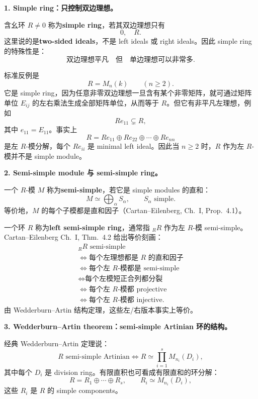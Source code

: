 \documentclass[a4paper]{ctexart}
\theoremstyle{definition}
\theoremstyle{analysis}
\theoremstyle{plain}
\begin{document}
\medskip

\textbf{1. Simple ring：只控制双边理想。}

含幺环 \(R\neq 0\) 称为\textbf{simple ring}，若其双边理想只有
\[
  0,\quad R.
\]
这里说的是\textbf{two-sided ideals}，不是 left ideals 或 right ideals。因此 simple ring 的特殊性是：
\[
  \text{双边理想平凡}
  \quad\text{但}\quad
  \text{单边理想可以非常多}.
\]

标准反例是
\[
  R=M_n(k)\qquad (n\ge 2).
\]
它是 simple ring，因为任意非零双边理想一旦含有某个非零矩阵，就可通过矩阵单位 \(E_{ij}\) 的左右乘法生成全部矩阵单位，从而等于 \(R\)。但它有非平凡左理想，例如
\[
  Re_{11}\subsetneq R,
\]
其中 \(e_{11}=E_{11}\)。事实上
\[
  R=Re_{11}\oplus Re_{22}\oplus\cdots\oplus Re_{nn}
\]
是左 \(R\)-模分解，每个 \(Re_{ii}\) 是 minimal left ideal。因此当 \(n\ge 2\) 时，\(R\) 作为左 \(R\)-模并不是 simple module。

\medskip

\textbf{2. Semi-simple module 与 semi-simple ring。}

一个 \(R\)-模 \(M\) 称为\textbf{semi-simple}，若它是 simple modules 的直和：
\[
  M\simeq \bigoplus_{\alpha} S_\alpha,
  \qquad S_\alpha\text{ simple}.
\]
等价地，\(M\) 的每个子模都是直和因子（Cartan--Eilenberg, Ch.~I, Prop.~4.1）。

一个环 \(R\) 称为\textbf{left semi-simple ring}，通常指 \({}_RR\) 作为左 \(R\)-模 semi-simple。Cartan--Eilenberg Ch.~I, Thm.~4.2 给出等价刻画：
\[
\begin{array}{c}
  {}_RR\text{ semi-simple}\\
  \Longleftrightarrow
  \text{每个左理想都是 }R\text{ 的直和因子}\\
  \Longleftrightarrow
  \text{每个左 }R\text{-模都是 semi-simple}\\
  \Longleftrightarrow
  \text{每个左模短正合列都分裂}\\
  \Longleftrightarrow
  \text{每个左 }R\text{-模都 projective}\\
  \Longleftrightarrow
  \text{每个左 }R\text{-模都 injective}.
\end{array}
\]
由 Wedderburn--Artin 结构定理，这些左/右版本事实上等价。

\medskip

\textbf{3. Wedderburn--Artin theorem：semi-simple Artinian 环的结构。}

经典 Wedderburn--Artin 定理说：
\[
  R\text{ semi-simple Artinian}
  \Longleftrightarrow
  R\simeq \prod_{i=1}^s M_{n_i}(D_i),
\]
其中每个 \(D_i\) 是 division ring。有限直积也可看成有限直和的环分解：
\[
  R=R_1\oplus\cdots\oplus R_s,
  \qquad
  R_i\simeq M_{n_i}(D_i),
\]
这些 \(R_i\) 是 \(R\) 的 simple components。
\end{document}
